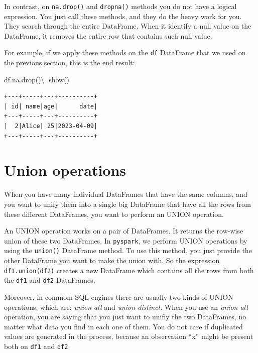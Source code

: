 \documentclass[
  11pt,
  letterpaper,
  DIV=11,
  numbers=noendperiod]{scrreprt}
\newenvironment{Shaded}{\begin{snugshade}}{\end{snugshade}}
\newcommand{\NormalTok}[1]{\textcolor[rgb]{0.00,0.23,0.31}{#1}}
\newcommand{\OperatorTok}[1]{\textcolor[rgb]{0.37,0.37,0.37}{#1}}
\begin{document}
In contrast, on \texttt{na.drop()} and \texttt{dropna()} methods you do
not have a logical expression. You just call these methods, and they do
the heavy work for you. They search through the entire DataFrame. When
it identify a null value on the DataFrame, it removes the entire row
that contains such null value.

For example, if we apply these methods on the \texttt{df} DataFrame that
we used on the previous section, this is the end result:

\begin{Shaded}
\begin{Highlighting}[]
\NormalTok{df.na.drop()}\OperatorTok{\textbackslash{}}
\NormalTok{    .show()}
\end{Highlighting}
\end{Shaded}

\begin{verbatim}
+---+-----+---+----------+
| id| name|age|      date|
+---+-----+---+----------+
|  2|Alice| 25|2023-04-09|
+---+-----+---+----------+
\end{verbatim}

\hypertarget{union-operations}{%
\section{Union operations}\label{union-operations}}

When you have many individual DataFrames that have the same columns, and
you want to unify them into a single big DataFrame that have all the
rows from these different DataFrames, you want to perform an UNION
operation.

An UNION operation works on a pair of DataFrames. It returns the
row-wise union of these two DataFrames. In \texttt{pyspark}, we perform
UNION operations by using the \texttt{union()} DataFrame method. To use
this method, you just provide the other DataFrame you want to make the
union with. So the expression \texttt{df1.union(df2)} creates a new
DataFrame which contains all the rows from both the \texttt{df1} and
\texttt{df2} DataFrames.

Moreover, in commom SQL engines there are usually two kinds of UNION
operations, which are: \emph{union all} and \emph{union distinct}. When
you use an \emph{union all} operation, you are saying that you just want
to unifiy the two DataFrames, no matter what data you find in each one
of them. You do not care if duplicated values are generated in the
process, because an observation ``x'' might be present both on
\texttt{df1} and \texttt{df2}.
\end{document}
